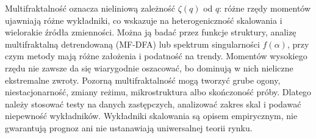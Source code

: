 \documentclass[11pt,a4paper]{article}
\begin{document}
Multifraktalność oznacza nieliniową zależność \(\zeta(q)\) od \(q\): różne rzędy momentów ujawniają różne wykładniki, co wskazuje na heterogeniczność skalowania i wielorakie źródła zmienności. Można ją badać przez funkcje struktury, analizę multifraktalną detrendowaną (MF-DFA) lub spektrum singularności \(f(\alpha)\), przy czym metody mają różne założenia i podatność na trendy. Momentów wysokiego rzędu nie zawsze da się wiarygodnie oszacować, bo dominują w nich nieliczne ekstremalne zwroty. Pozorną multifraktalność mogą tworzyć grube ogony, niestacjonarność, zmiany reżimu, mikrostruktura albo skończoność próby. Dlatego należy stosować testy na danych zastępczych, analizować zakres skal i podawać niepewność wykładników. Wykładniki skalowania są opisem empirycznym, nie gwarantują prognoz ani nie ustanawiają uniwersalnej teorii rynku.
\end{document}

